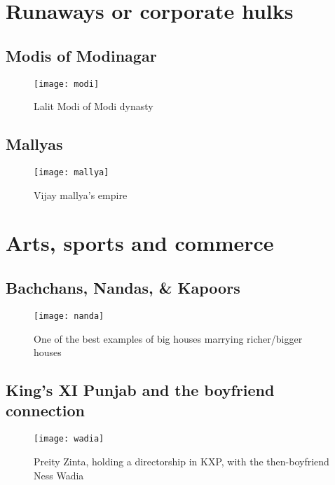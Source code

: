 \section{Runaways or corporate hulks}

\subsection{Modis of Modinagar}

\begin{figure}[H]
\begin{center}  
\texttt{[image: modi]} 
\caption{Lalit Modi of Modi dynasty}
\label{fig:modi}
\end{center}
\end{figure}


\subsection{Mallyas}

\begin{figure}[H]
\begin{center}  
\texttt{[image: mallya]} 
\caption{Vijay mallya's empire}
\label{fig:mallya}
\end{center}
\end{figure}

\section{Arts, sports and commerce}

\subsection{Bachchans, Nandas, \& Kapoors}

\begin{figure}[H]
\begin{center}  
\texttt{[image: nanda]} 
\caption{One of the best examples of big houses marrying richer/bigger houses}
\label{fig:nanda}
\end{center}
\end{figure}

\subsection{King's XI Punjab and the boyfriend connection}

\begin{figure}[H]
\begin{center}  
\texttt{[image: wadia]} 
\caption{Preity Zinta, holding a directorship in KXP, with the then-boyfriend Ness Wadia}
\label{fig:wadia}
\end{center}
\end{figure}

